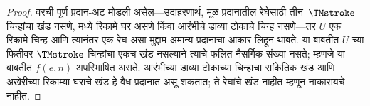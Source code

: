 \documentclass[../../../include/open-logic-section]{subfiles}
\begin{document}
\begin{proof}
  वरची पूर्ण प्रदान-अट मोडली असेल—उदाहरणार्थ, मूळ प्रदानातील
  रेघेसाठी तीन~$\TMstroke$ चिन्हांचा खंड नसणे, मध्ये रिकामे घर
  असणे किंवा आरंभीचे डाव्या टोकाचे चिन्ह नसणे—तर $U$
  एक रिकामे चिन्ह आणि त्यानंतर एक रेघ असा मुद्दाम अमान्य
  प्रदानाचा आकार लिहून थांबते. या बाबतीत $U$ च्या फितीवर
  $\TMstroke$ चिन्हांचा एकच खंड नसल्याने
  त्याचे फलित नैसर्गिक संख्या नसते; म्हणजे
  या बाबतीत $f(e,n)$ अपरिभाषित असते. आरंभीच्या डाव्या टोकाच्या
  चिन्हाचा सांकेतिक खंड आणि अखेरीच्या रिकाम्या घरांचे खंड
  हे वैध प्रदानात असू शकतात; ते रेघांचे खंड नाहीत म्हणून नाकारायचे नाहीत.
\end{proof}
\end{document}
